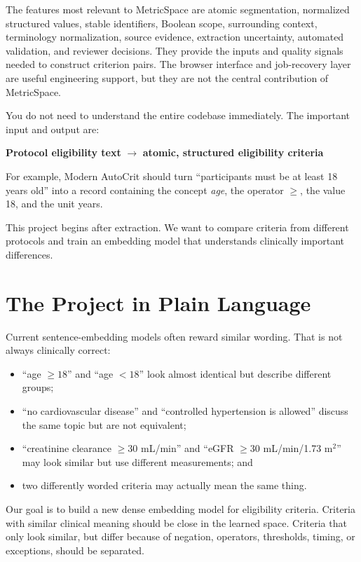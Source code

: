 \documentclass[11pt]{article}
\begin{document}
The features most relevant to MetricSpace are atomic segmentation, normalized structured values, stable identifiers, Boolean scope, surrounding context, terminology normalization, source evidence, extraction uncertainty, automated validation, and reviewer decisions. They provide the inputs and quality signals needed to construct criterion pairs. The browser interface and job-recovery layer are useful engineering support, but they are not the central contribution of MetricSpace.

You do not need to understand the entire codebase immediately. The important input and output are:

\begin{center}
\textbf{Protocol eligibility text}
$\longrightarrow$
\textbf{atomic, structured eligibility criteria}
\end{center}

For example, Modern AutoCrit should turn ``participants must be at least 18 years old'' into a record containing the concept \emph{age}, the operator $\geq$, the value 18, and the unit years.

This project begins after extraction. We want to compare criteria from different protocols and train an embedding model that understands clinically important differences.

\section{The Project in Plain Language}

Current sentence-embedding models often reward similar wording. That is not always clinically correct:

\begin{itemize}
    \item ``age $\geq18$'' and ``age $<18$'' look almost identical but describe different groups;
    \item ``no cardiovascular disease'' and ``controlled hypertension is allowed'' discuss the same topic but are not equivalent;
    \item ``creatinine clearance $\geq30$ mL/min'' and ``eGFR $\geq30$ mL/min/1.73 m$^2$'' may look similar but use different measurements; and
    \item two differently worded criteria may actually mean the same thing.
\end{itemize}

Our goal is to build a new dense embedding model for eligibility criteria. Criteria with similar clinical meaning should be close in the learned space. Criteria that only look similar, but differ because of negation, operators, thresholds, timing, or exceptions, should be separated.
\end{document}
